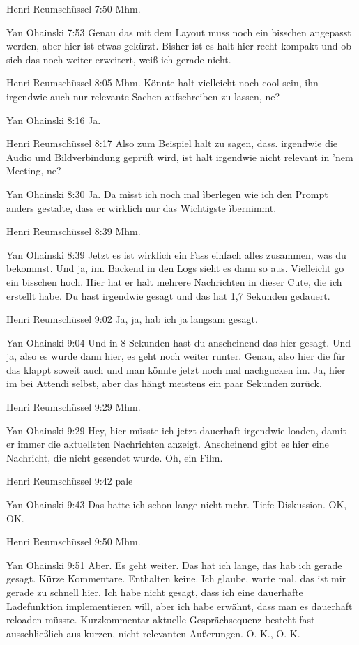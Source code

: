 Henri Reumschüssel   7:50
Mhm.

Yan Ohainski   7:53
Genau das mit dem Layout muss noch ein bisschen angepasst werden, aber hier ist etwas gekürzt.
Bisher ist es halt hier recht kompakt und ob sich das noch weiter erweitert, weiß ich gerade nicht.

Henri Reumschüssel   8:05
Mhm.
Könnte halt vielleicht noch cool sein, ihn irgendwie auch nur relevante Sachen aufschreiben zu lassen, ne?

Yan Ohainski   8:16
Ja.

Henri Reumschüssel   8:17
Also zum Beispiel halt zu sagen, dass.
irgendwie
die Audio und Bildverbindung geprüft wird, ist halt irgendwie nicht relevant in 'nem Meeting, ne?

Yan Ohainski   8:30
Ja.
Da mìsst ich noch mal ìberlegen wie ich den Prompt anders gestalte, dass er wirklich nur das Wichtigste ìbernimmt.

Henri Reumschüssel   8:39
Mhm.

Yan Ohainski   8:39
Jetzt es ist wirklich ein Fass einfach alles zusammen, was du bekommst.
Und ja, im.
Backend in den Logs sieht es dann so aus.
Vielleicht go ein bisschen hoch. Hier hat er halt mehrere Nachrichten in dieser Cute, die ich erstellt habe. Du hast irgendwie gesagt und das hat 1,7 Sekunden gedauert.

Henri Reumschüssel   9:02
Ja, ja, hab ich ja langsam gesagt.

Yan Ohainski   9:04
Und in 8 Sekunden hast du anscheinend das hier gesagt.
Und ja, also es wurde dann hier, es geht noch weiter runter.
Genau, also hier die für das klappt soweit auch und man könnte jetzt noch mal nachgucken im.
Ja, hier im bei Attendi selbst, aber das hängt meistens ein paar Sekunden zurück.

Henri Reumschüssel   9:29
Mhm.

Yan Ohainski   9:29
Hey, hier müsste ich jetzt dauerhaft irgendwie loaden, damit er immer die aktuellsten Nachrichten anzeigt. Anscheinend gibt es hier eine Nachricht, die nicht gesendet wurde.
Oh, ein Film.

Henri Reumschüssel   9:42
pale

Yan Ohainski   9:43
Das hatte ich schon lange nicht mehr.
Tiefe Diskussion. OK, OK.

Henri Reumschüssel   9:50
Mhm.

Yan Ohainski   9:51
Aber.
Es geht weiter. Das hat ich lange, das hab ich gerade gesagt.
Kürze Kommentare.
Enthalten keine. Ich glaube, warte mal, das ist mir gerade zu schnell hier.
Ich habe nicht gesagt, dass ich eine dauerhafte Ladefunktion implementieren will, aber ich habe erwähnt, dass man es dauerhaft reloaden müsste.
Kurzkommentar aktuelle Gesprächsequenz besteht fast ausschließlich aus kurzen, nicht relevanten Äußerungen. O. K., O. K.

